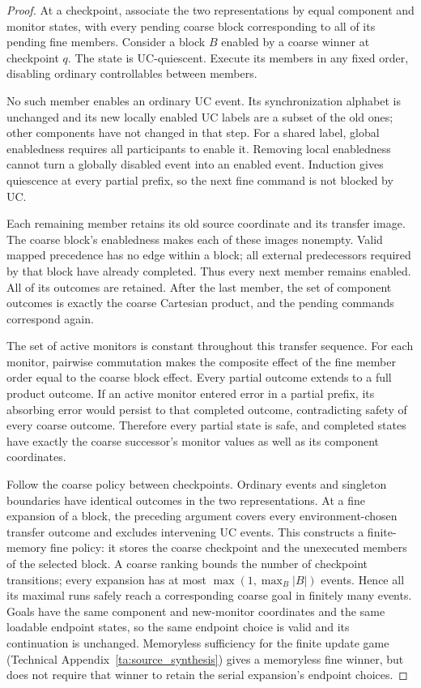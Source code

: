 \begin{proof}
At a checkpoint, associate the two representations by equal component and monitor states, with every pending coarse block corresponding to all of its pending fine members. Consider a block $B$ enabled by a coarse winner at checkpoint $q$. The state is UC-quiescent. Execute its members in any fixed order, disabling ordinary controllables between members.

No such member enables an ordinary UC event. Its synchronization alphabet is unchanged and its new locally enabled UC labels are a subset of the old ones; other components have not changed in that step. For a shared label, global enabledness requires all participants to enable it. Removing local enabledness cannot turn a globally disabled event into an enabled event. Induction gives quiescence at every partial prefix, so the next fine command is not blocked by UC.

Each remaining member retains its old source coordinate and its transfer image. The coarse block's enabledness makes each of these images nonempty. Valid mapped precedence has no edge within a block; all external predecessors required by that block have already completed. Thus every next member remains enabled. All of its outcomes are retained. After the last member, the set of component outcomes is exactly the coarse Cartesian product, and the pending commands correspond again.

The set of active monitors is constant throughout this transfer sequence. For each monitor, pairwise commutation makes the composite effect of the fine member order equal to the coarse block effect. Every partial outcome extends to a full product outcome. If an active monitor entered error in a partial prefix, its absorbing error would persist to that completed outcome, contradicting safety of every coarse outcome. Therefore every partial state is safe, and completed states have exactly the coarse successor's monitor values as well as its component coordinates.

Follow the coarse policy between checkpoints. Ordinary events and singleton boundaries have identical outcomes in the two representations. At a fine expansion of a block, the preceding argument covers every environment-chosen transfer outcome and excludes intervening UC events. This constructs a finite-memory fine policy: it stores the coarse checkpoint and the unexecuted members of the selected block. A coarse ranking bounds the number of checkpoint transitions; every expansion has at most $\max(1,\max_B|B|)$ events. Hence all its maximal runs safely reach a corresponding coarse goal in finitely many events. Goals have the same component and new-monitor coordinates and the same loadable endpoint states, so the same endpoint choice is valid and its continuation is unchanged. Memoryless sufficiency for the finite update game (Technical Appendix~\ref{ta:source_synthesis}) gives a memoryless fine winner, but does not require that winner to retain the serial expansion's endpoint choices.
\end{proof}

